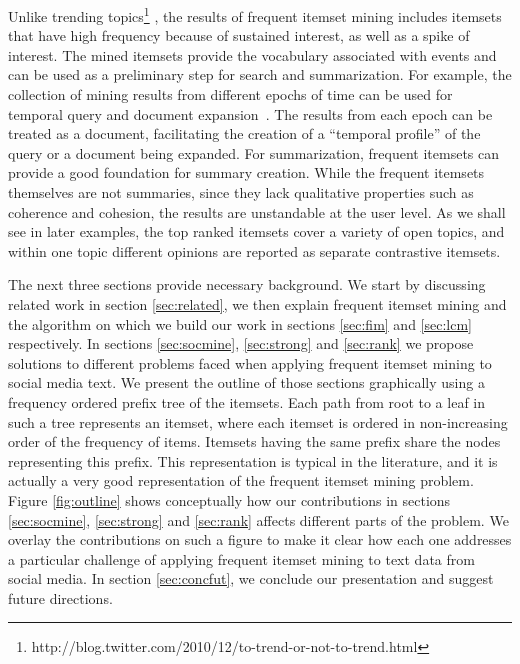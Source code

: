 \documentclass{sig-alternate}
\begin{document}
Unlike trending
topics\footnote{http://blog.twitter.com/2010/12/to-trend-or-not-to-trend.html}
\cite{mathioudakis2010twittermonitor}, the results of frequent itemset
mining includes itemsets that have high frequency because of sustained interest,
as well as a spike of interest.
The mined itemsets provide the vocabulary associated with events and can be
used as a preliminary step for search and summarization.
For example, the collection of mining results from different epochs of time
can be used for temporal query and document
expansion~\cite{choi2012temporal, efron2012improving}.
The results from each epoch can be treated as a document, facilitating the
creation of a ``temporal profile''\cite{jones2007temporal} of the query
or a document being expanded.
For summarization, frequent itemsets can provide a good foundation for summary
creation.
While the frequent itemsets themselves are not summaries, since they lack
qualitative properties such as coherence and cohesion, the results are
unstandable at the user level.
As we shall see in later examples, the top ranked itemsets cover a variety
of open topics, and within one topic different opinions are reported as
separate contrastive itemsets.

The next three sections provide necessary background.
We start by discussing related work in section \ref{sec:related},
we then explain frequent itemset mining and the algorithm on which we build
our work in sections \ref{sec:fim} and \ref{sec:lcm} respectively.
In sections \ref{sec:socmine}, \ref{sec:strong} and \ref{sec:rank} we
propose solutions to different problems faced when applying frequent
itemset mining to social media text.
We present the outline of those sections graphically using a
frequency ordered prefix tree of the itemsets.
Each path from root to a leaf in such a tree represents an itemset,
where each itemset is ordered in non-increasing order of the frequency of
items.
Itemsets having the same prefix share the nodes representing this prefix.
This representation is typical in the literature, and it is actually a very
good representation of the frequent itemset mining problem.
Figure \ref{fig:outline} shows conceptually how our contributions in sections  \ref{sec:socmine},
\ref{sec:strong} and \ref{sec:rank}  affects different parts of the
problem. We overlay the contributions on such a figure to make it clear how each one addresses a particular challenge of applying frequent itemset mining to text data from social media. In section \ref{sec:concfut}, we conclude our presentation and
suggest future directions.
\end{document}

